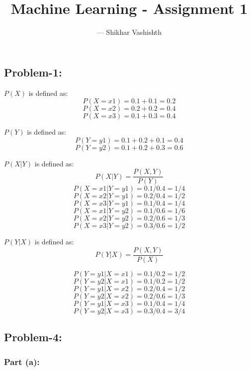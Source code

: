 \documentclass[11pt]{article}
\begin{document}
	\title{Machine Learning - Assignment 1}
	\author{\begin{small}--- Shikhar Vashishth\end{small}}
	\date{}
	\maketitle
	
	\subsectionfont{}
	
\begin{flushleft}
		
\subsection*{Problem-1:}
$P(X)$ is defined as:
$$P(X=x1) = 0.1 + 0.1 = 0.2$$
$$P(X=x2) = 0.2 + 0.2 = 0.4$$
$$P(X=x3) = 0.1 + 0.3 = 0.4$$

$P(Y)$ is defined as:
$$P(Y=y1) = 0.1 + 0.2 + 0.1 = 0.4$$
$$P(Y=y2) = 0.1 + 0.2 + 0.3 = 0.6$$

$P(X|Y)$ is defined as:
$$P(X|Y) = \frac{P(X,Y)}{P(Y)}$$
$$P(X=x1|Y=y1) = 0.1/0.4 = 1/4$$
$$P(X=x2|Y=y1) = 0.2/0.4 = 1/2$$
$$P(X=x3|Y=y1) = 0.1/0.4 = 1/4$$
$$P(X=x1|Y=y2) = 0.1/0.6 = 1/6$$
$$P(X=x2|Y=y2) = 0.2/0.6 = 1/3$$
$$P(X=x3|Y=y2) = 0.3/0.6 = 1/2$$

$P(Y|X)$ is defined as:
$$P(Y|X) = \frac{P(X,Y)}{P(X)}$$

$$P(Y=y1|X=x1) = 0.1/0.2 = 1/2$$
$$P(Y=y2|X=x1) = 0.1/0.2 = 1/2$$
$$P(Y=y1|X=x2) = 0.2/0.4 = 1/2$$
$$P(Y=y2|X=x2) = 0.2/0.6 = 1/3$$
$$P(Y=y1|X=x3) = 0.1/0.4 = 1/4$$
$$P(Y=y2|X=x3) = 0.3/0.4 = 3/4$$

\subsection*{Problem-4:}
\subsubsection*{Part (a):}
\begin{figure}[H]
	\centering
\end{figure}


\end{flushleft}
\end{document}
